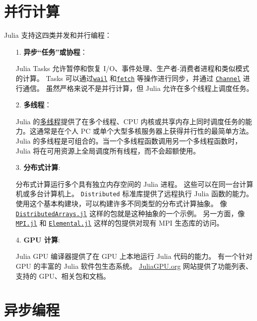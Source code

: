 \chapter{并行计算}



Julia 支持这四类并发和并行编程：



\begin{itemize}
\item[1. ] \textbf{异步“任务”或协程}：

Julia Tasks 允许暂停和恢复 I/O、事件处理、生产者-消费者进程和类似模式的计算。 Tasks 可以通过\href{@ref}{\texttt{wail}} 和\hyperlink{11007884648860062495}{\texttt{fetch}} 等操作进行同步，并通过 \hyperlink{12548845729684045604}{\texttt{Channel}} 进行通信。 虽然严格来说不是并行计算，但 Julia 允许在多个线程上调度任务。


\item[2. ] \textbf{多线程}：

Julia 的\hyperlink{3839117367442451534}{多线程}提供了在多个线程、CPU 内核或共享内存上同时调度任务的能力。这通常是在个人 PC 或单个大型多核服务器上获得并行性的最简单方法。 Julia 的多线程是可组合的。当一个多线程函数调用另一个多线程函数时，Julia 将在可用资源上全局调度所有线程，而不会超额使用。


\item[3. ] \textbf{分布式计算}:

分布式计算运行多个具有独立内存空间的 Julia 进程。 这些可以在同一台计算机或多台计算机上。 \texttt{Distributed} 标准库提供了远程执行 Julia 函数的能力。 使用这个基本构建块，可以构建许多不同类型的分布式计算抽象。 像 \href{https://github.com/JuliaParallel/DistributedArrays.jl}{\texttt{DistributedArrays.jl}} 这样的包就是这种抽象的一个示例。 另一方面，像 \href{https://github.com/JuliaParallel/MPI.jl}{\texttt{MPI.jl}} 和 \href{https://github.com/JuliaParallel/Elemental.jl}{\texttt{Elemental.jl}} 这样的包提供对现有 MPI 生态库的访问。


\item[4. ] \textbf{GPU 计算}:

Julia GPU 编译器提供了在 GPU 上本地运行 Julia 代码的能力。 有一个针对 GPU 的丰富的 Julia 软件包生态系统。 \href{https://juliagpu.org}{JuliaGPU.org} 网站提供了功能列表、支持的 GPU、相关包和文档。

\end{itemize}


\hypertarget{2579276902393370275}{}


\chapter{异步编程}



